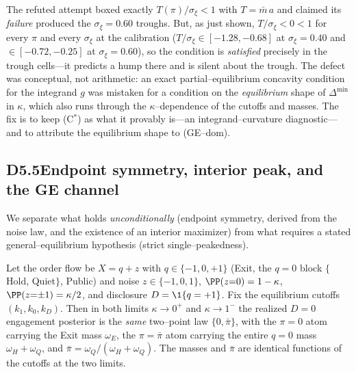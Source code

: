 \begin{remark}
\label{rem:d5-wrongT}
The refuted attempt boxed exactly $T(\pi)/\sigma_\xi<1$ with $T=\bar m\,a$ and
claimed its \emph{failure} produced the $\sigma_\xi=0.60$ troughs. But, as just
shown, $T/\sigma_\xi<0<1$ for every $\pi$ and every $\sigma_\xi$ at the
calibration ($T/\sigma_\xi\in[-1.28,-0.68]$ at $\sigma_\xi=0.40$ and
$\in[-0.72,-0.25]$ at $\sigma_\xi=0.60$), so the condition is \emph{satisfied}
precisely in the trough cells---it predicts a hump there and is silent about the
trough. The defect was conceptual, not arithmetic: an exact
partial--equilibrium concavity condition for the integrand $g$ was mistaken for
a condition on the \emph{equilibrium} shape of $\Delta^{\min}$ in $\kappa$, which
also runs through the $\kappa$--dependence of the cutoffs and masses. The fix is
to keep (C$^\ast$) as what it provably is---an integrand--curvature
diagnostic---and to attribute the equilibrium shape to (GE--dom).
\end{remark}

\subsection*{D5.5\quad Endpoint symmetry, interior peak, and the GE channel}

We separate what holds \emph{unconditionally} (endpoint symmetry, derived from
the noise law, and the existence of an interior maximizer) from what requires a
stated general--equilibrium hypothesis (strict single--peakedness).

\begin{lemma}\label{lem:d5-endpoints}
Let the order flow be $X=q+z$ with $q\in\{-1,0,+1\}$ (Exit, the $q{=}0$ block
$\{$Hold, Quiet$\}$, Public) and noise $z\in\{-1,0,1\}$, $\PP(z{=}0)=1-\kappa$,
$\PP(z{=}{\pm}1)=\kappa/2$, and disclosure $D=\1\{q=+1\}$. Fix the equilibrium
cutoffs $(k_1,k_0,k_D)$. Then in both limits $\kappa\to0^+$ and $\kappa\to1^-$
the realized $D=0$ engagement posterior is the \emph{same} two--point law
$\{0,\bar\pi\}$, with the $\pi=0$ atom carrying the Exit mass $\omega_E$, the
$\pi=\bar\pi$ atom carrying the entire $q{=}0$ mass $\omega_H+\omega_Q$, and
$\bar\pi=\omega_Q/(\omega_H+\omega_Q)$. The masses and $\bar\pi$ are identical
functions of the cutoffs at the two limits.
\end{lemma}

